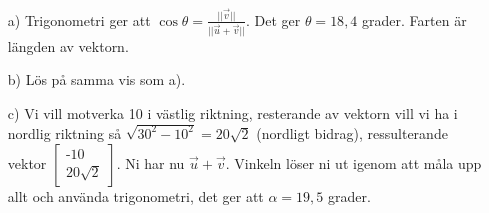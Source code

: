 \begin{enumerate}
	\item [a) ] Trigonometri ger att $\cos\theta = \frac{||\vec{v}||}{||\vec{u} + \vec{v}||} $. Det ger $\theta = 18,4$ grader. Farten är längden av vektorn.
	\item [b) ] Lös på samma vis som a). 
	\item [c) ] Vi vill motverka 10 i västlig riktning, resterande av vektorn vill vi ha i nordlig riktning så $\sqrt{30^{2}-10^{2}} = 20\sqrt{2}$ (nordligt bidrag), ressulterande vektor $\begin{bmatrix} \text{-}10 \\ 20\sqrt{2}\end{bmatrix}$. Ni har nu $\vec{u} + \vec{v}$. Vinkeln löser ni ut igenom att måla upp allt och använda trigonometri, det ger att $\alpha = 19,5$ grader. 
\end{enumerate}